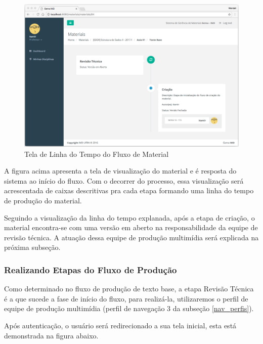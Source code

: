 \begin{figure}[H]
\centering
     \includegraphics[width=1.0\textwidth]{Screens/MaterialTimeline.png}
      \caption{Tela de Linha do Tempo do Fluxo de Material}
       \label{fig:MaterialTimeline}
\end{figure}

A figura acima apresenta a tela de visualização do material e é resposta do sistema ao início do fluxo. Com o decorrer do processo, essa visualização será acrescentada de caixas descritivas pra cada etapa formando uma linha do tempo de produção do material.

Seguindo a visualização da linha do tempo explanada, após a etapa de criação, o material encontra-se com uma versão em aberto na responsabilidade da equipe de revisão técnica. A atuação dessa equipe de produção multimídia será explicada na próxima subseção. 

\subsubsection{Realizando Etapas do Fluxo de Produção}

Como determinado no fluxo de produção de texto base, a etapa Revisão Técnica é a que sucede a fase de início do fluxo, para realizá-la, utilizaremos o perfil de equipe de produção multimídia (perfil de navegação 3 da subseção \hyperref[nav_perfis]{\ref{nav_perfis}}).

Após autenticação, o usuário será redirecionado a sua tela inicial, esta está demonstrada na figura abaixo.

